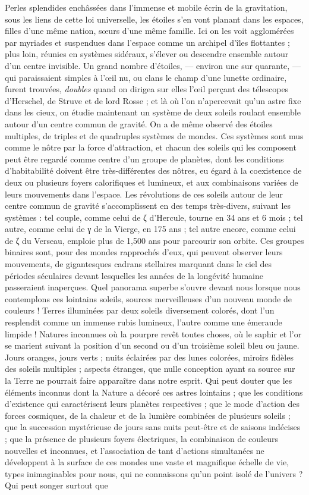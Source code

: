 \documentclass[a4paper, 11pt, oneside]{article}
\begin{document}
Perles splendides enchâssées dans l'immense et mobile écrin de la gravitation, sous les liens de cette loi universelle, les étoiles s'en vont planant dans les espaces, filles d'une même nation, sœurs d'une même famille. Ici on les voit agglomérées par myriades et suspendues dans l'espace comme un archipel d'îles flottantes ; plus loin, réunies en systèmes sidéraux, s'élever ou descendre ensemble autour d'un centre invisible. Un grand nombre d'étoiles, --- environ une sur quarante, --- qui paraissaient simples à l'œil nu, ou clans le champ d'une lunette ordinaire, furent trouvées, \emph{doubles} quand on dirigea sur elles l'œil perçant des télescopes d'Herschel, de Struve et de lord Rosse ; et là où l'on n'apercevait qu'un astre fixe dans les cieux, on étudie maintenant un système de deux soleils roulant ensemble autour d'un centre commun de gravité. On a de même observé des étoiles multiples, de triples et de quadruples systèmes de mondes. Ces systèmes sont mus comme le nôtre par la force d'attraction, et chacun des soleils qui les composent peut être regardé comme centre d'un groupe de planètes, dont les conditions d'habitabilité doivent être très-différentes des nôtres, eu égard à la coexistence de deux ou plusieurs foyers calorifiques et lumineux, et aux combinaisons variées de leurs mouvements dans l'espace. Les révolutions de ces soleils autour de leur centre commun de gravité s'accomplissent en des temps très-divers, suivant les systèmes : tel couple, comme celui de ζ d'Hercule, tourne en 34 ans et 6 mois ; tel autre, comme celui de γ de la Vierge, en 175 ans ; tel autre encore, comme celui de ζ du Verseau, emploie plus de 1,500 ans pour parcourir son orbite. Ces groupes binaires sont, pour des mondes rapprochés d'eux, qui peuvent observer leurs mouvements, de gigantesques cadrans stellaires marquant dans le ciel des périodes séculaires devant lesquelles les années de la longévité humaine passeraient inaperçues. Quel panorama superbe s'ouvre devant nous lorsque nous contemplons ces lointains soleils, sources merveilleuses d'un nouveau monde de couleurs ! Terres illuminées par deux soleils diversement colorés, dont l'un resplendit comme un immense rubis lumineux, l'autre comme une émeraude limpide ! Natures inconnues où la pourpre revêt toutes choses, où le saphir et l'or se marient suivant la position d'un second ou d'un troisième soleil bleu ou jaune. Jours oranges, jours verts ; nuits éclairées par des lunes colorées, miroirs fidèles des soleils multiples ; aspects étranges, que nulle conception ayant sa source sur la Terre ne pourrait faire apparaître dans notre esprit. Qui peut douter que les éléments inconnus dont la Nature a décoré ces astres lointains ; que les conditions d'existence qui caractérisent leurs planètes respectives ; que le mode d'action des forces cosmiques, de la chaleur et de la lumière combinées de plusieurs soleils ; que la succession mystérieuse de jours sans nuits peut-être et de saisons indécises ; que la présence de plusieurs foyers électriques, la combinaison de couleurs nouvelles et inconnues, et l'association de tant d'actions simultanées ne développent à la surface de ces mondes une vaste et magnifique échelle de vie, types inimaginables pour nous, qui ne connaissons qu'un point isolé de l'univers ? Qui peut songer surtout que 
\end{document}
